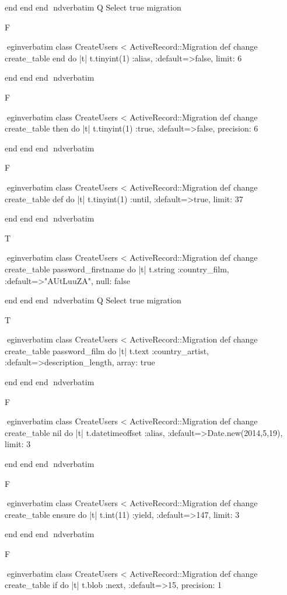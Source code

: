     end 
  end 
end
nd{verbatim}
Q
 Select true migration

F

egin{verbatim}
 class CreateUsers < ActiveRecord::Migration 
  def change 
    create_table end do |t| 
      t.tinyint(1) :alias, :default=>false, limit: 6
    
    end 
  end 
end
nd{verbatim}

F

egin{verbatim}
 class CreateUsers < ActiveRecord::Migration 
  def change 
    create_table then do |t| 
      t.tinyint(1) :true, :default=>false, precision: 6
    
    end 
  end 
end
nd{verbatim}

F

egin{verbatim}
 class CreateUsers < ActiveRecord::Migration 
  def change 
    create_table def do |t| 
      t.tinyint(1) :until, :default=>true, limit: 37
    
    end 
  end 
end
nd{verbatim}

T

egin{verbatim}
 class CreateUsers < ActiveRecord::Migration 
  def change 
    create_table password_firstname do |t| 
      t.string :country_film, :default=>"AUtLuuZA", null: false
    
    end 
  end 
end
nd{verbatim}
Q
 Select true migration

T

egin{verbatim}
 class CreateUsers < ActiveRecord::Migration 
  def change 
    create_table password_film do |t| 
      t.text :country_artist, :default=>description_length, array: true
    
    end 
  end 
end
nd{verbatim}

F

egin{verbatim}
 class CreateUsers < ActiveRecord::Migration 
  def change 
    create_table nil do |t| 
      t.datetimeoffset :alias, :default=>Date.new(2014,5,19), limit: 3
    
    end 
  end 
end
nd{verbatim}

F

egin{verbatim}
 class CreateUsers < ActiveRecord::Migration 
  def change 
    create_table ensure do |t| 
      t.int(11) :yield, :default=>147, limit: 3
    
    end 
  end 
end
nd{verbatim}

F

egin{verbatim}
 class CreateUsers < ActiveRecord::Migration 
  def change 
    create_table if do |t| 
      t.blob :next, :default=>15, precision: 1
    

